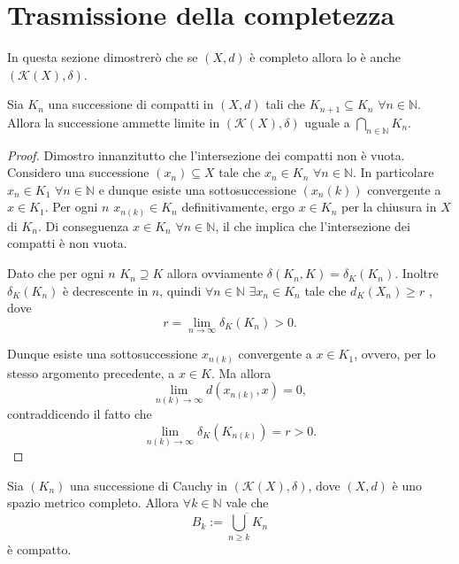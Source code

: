 \section{Trasmissione della completezza}



In questa sezione dimostrerò che se $\left (X,d\right )$ è completo allora lo è anche $\left (\mathcal{K}(X),\delta\right  ) $.


\begin{lemma} \label {pereppeppeppe}
Sia $K_n$ una successione di compatti in $\left (X,d\right )$ tali che $K_{n+1}\subseteq K_n$ $ \forall n \in \mathbb{N}$. Allora la successione ammette limite in $\left (\mathcal{K}(X),\delta\right  ) $ uguale a $ \bigcap_{n \in \mathbb{N}}K_n $.
\end{lemma}

\begin{proof}
Dimostro innanzitutto che l'intersezione dei compatti non è vuota. Considero una successione $\left (x_n\right ) \subseteq X$ tale che $x_n \in K_n$ $ \forall n \in \mathbb{N}$. In particolare  $x_n \in K_1$ $ \forall n \in \mathbb{N}$ e dunque esiste una sottosuccessione  $\left (x_n(k)\right )$ convergente a $x\in K_1$. Per ogni $n$  $x_{n(k)}\in K_n$ definitivamente, ergo $x\in K_n$ per la chiusura in $X$ di $K_n$. Di conseguenza $x \in K_n$ $ \forall n \in \mathbb{N}$, il che implica che l'intersezione dei compatti è non vuota.

Dato che per ogni $n$ $K_n\supseteq K$ allora ovviamente $\delta\left  (K_n,K\right )=\delta_{K}\left (K_n\right )$. Inoltre $\delta_{K}\left (K_n\right )$ è decrescente in $n$, quindi $ \forall n \in \mathbb{N}$ $\exists x_n \in K_n$ tale che $d_K\left (X_n\right )\geq r$ , dove 
\begin{equation*}
r=\lim_{n \to \infty}\delta_{K}\left (K_n\right )>0.
\end{equation*}

Dunque esiste una sottosuccessione $x_{n(k)}$ convergente a $x\in K_1$, ovvero, per lo stesso argomento precedente, a  $x\in K$. Ma allora 
\begin{equation*}
\lim_{n(k) \to \infty}d(x_{n(k)},x)=0,
\end{equation*}
contraddicendo il fatto che
\begin{equation*}
\lim_{n(k) \to \infty}\delta_{K}(K_{n(k)})=r>0.
\end{equation*}
\end{proof}

\begin{theorem}
Sia $(K_n)$ una successione di Cauchy in $\left (\mathcal{K}(X),\delta\right  ) $, dove $\left (X, d\right )$ è uno spazio metrico completo. Allora $\forall k \in \mathbb{N}$ vale che
\begin{equation*}
B_k:=\overline{\bigcup_{n\geq k} K_n}
\end{equation*}
è compatto.
\end{theorem}

